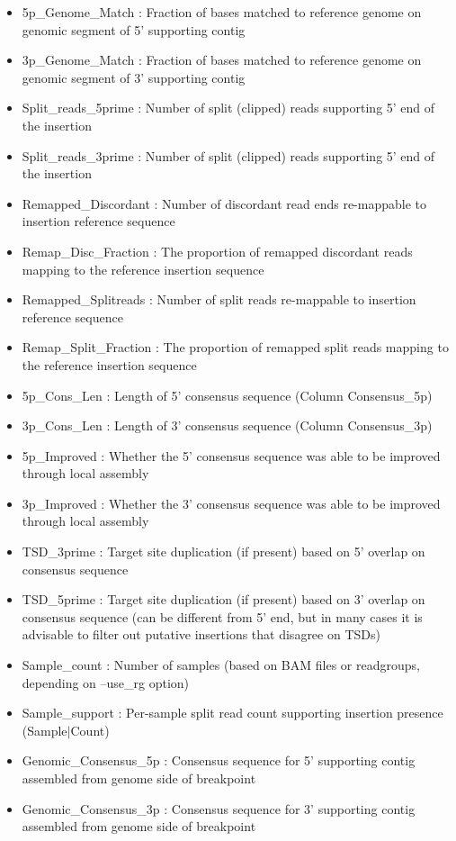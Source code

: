\documentclass[letterpaper,11pt]{article}
\begin{document}
\begin{itemize}
\item 5p\_Genome\_Match : Fraction of bases matched to reference genome on genomic segment of 5' supporting contig
\item 3p\_Genome\_Match : Fraction of bases matched to reference genome on genomic segment of 3' supporting contig
\item Split\_reads\_5prime : Number of split (clipped) reads supporting 5' end of the insertion
\item Split\_reads\_3prime : Number of split (clipped) reads supporting 5' end of the insertion
\item Remapped\_Discordant : Number of discordant read ends re-mappable to insertion reference sequence
\item Remap\_Disc\_Fraction : The proportion of remapped discordant reads mapping to the reference insertion sequence
\item Remapped\_Splitreads : Number of split reads re-mappable to insertion reference sequence
\item Remap\_Split\_Fraction : The proportion of remapped split reads mapping to the reference insertion sequence
\item 5p\_Cons\_Len : Length of 5' consensus sequence (Column Consensus\_5p)
\item 3p\_Cons\_Len : Length of 3' consensus sequence (Column Consensus\_3p)
\item 5p\_Improved : Whether the 5' consensus sequence was able to be improved through local assembly
\item 3p\_Improved : Whether the 3' consensus sequence was able to be improved through local assembly
\item TSD\_3prime : Target site duplication (if present) based on 5' overlap on consensus sequence
\item TSD\_5prime : Target site duplication (if present) based on 3' overlap on consensus sequence (can be different from 5' end, but in many cases it is advisable to filter out putative insertions that disagree on TSDs)
\item Sample\_count : Number of samples (based on BAM files or readgroups, depending on --use\_rg option)
\item Sample\_support : Per-sample split read count supporting insertion presence (Sample$\vert$Count)
\item Genomic\_Consensus\_5p : Consensus sequence for 5' supporting contig assembled from genome side of breakpoint
\item Genomic\_Consensus\_3p : Consensus sequence for 3' supporting contig assembled from genome side of breakpoint

\end{itemize}
\end{document}
